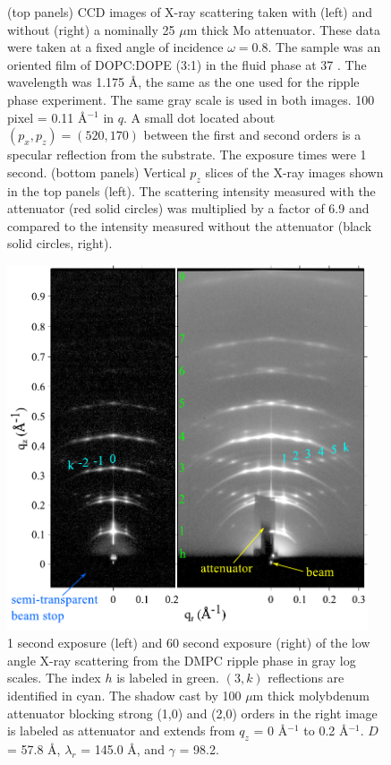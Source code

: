 \begin{figure}[jtbp]
  \caption{(top panels) CCD images of X-ray scattering taken with (left) and without 
  (right) a nominally 25 $\mu$m thick Mo attenuator. These data were taken 
  at a fixed angle of incidence $\omega=0.8$\textdegree. The sample was an oriented film of 
  DOPC:DOPE (3:1) in the fluid phase at 37 \textcelsius. The wavelength
  was 1.175 \AA, the same as the one used for the ripple phase experiment.
  The same gray scale is used in both images. 100 pixel =  0.11 \AA$^{-1}$ in $q$. 
  A small dot located about $(p_x,p_z)=(520,170)$ between the first and second orders is 
  a specular reflection from the substrate. The exposure times were 1 second. 
  (bottom panels) Vertical $p_z$ slices of the X-ray images shown in the top panels (left).
  The scattering intensity measured with the attenuator (red solid circles) 
  was multiplied by a factor of 6.9 and compared to the intensity measured 
  without the attenuator (black solid circles, right).}
  \label{fig:olddopc}
\end{figure}


\begin{figure}[htbp]
  \centering
  \includegraphics[width=0.95\textwidth]{figures/ripple/ripple083and085}
  \caption{1 second exposure (left) and 60 second exposure (right) of the low
  angle X-ray scattering from the DMPC ripple phase in gray log scales. 
  The index $h$ is 
  labeled in green. $(3,k)$ reflections are identified in cyan. 
  The shadow cast by 100 $\mu$m thick molybdenum attenuator blocking
  strong (1,0) and (2,0) orders in the right image is labeled as attenuator
  and extends from $q_z$ = 0 \AA$^{-1}$ to 0.2 \AA$^{-1}$.
  $D$ = 57.8 \AA, $\lambda_r$ = 145.0 \AA, and $\gamma$ = 98.2\textdegree.}
  \label{fig:ripple_laxs_images}  
\end{figure} 

